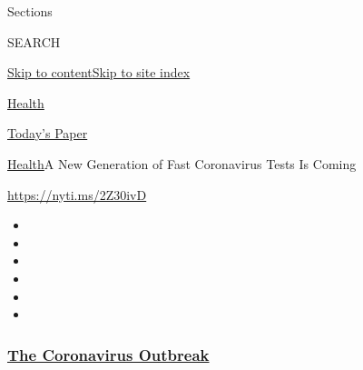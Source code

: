 Sections

SEARCH

\protect\hyperlink{site-content}{Skip to
content}\protect\hyperlink{site-index}{Skip to site index}

\href{https://www.nytimes3xbfgragh.onion/section/health}{Health}

\href{https://myaccount.nytimes3xbfgragh.onion/auth/login?response_type=cookie\&client_id=vi}{}

\href{https://www.nytimes3xbfgragh.onion/section/todayspaper}{Today's
Paper}

\href{/section/health}{Health}\textbar{}A New Generation of Fast
Coronavirus Tests Is Coming

\url{https://nyti.ms/2Z30ivD}

\begin{itemize}
\item
\item
\item
\item
\item
\item
\end{itemize}

\hypertarget{the-coronavirus-outbreak}{%
\subsubsection{\texorpdfstring{\href{https://www.nytimes3xbfgragh.onion/news-event/coronavirus?name=styln-coronavirus-national\&region=TOP_BANNER\&block=storyline_menu_recirc\&action=click\&pgtype=Article\&impression_id=cadc1e70-f4b6-11ea-90f6-17a6587a4d59\&variant=undefined}{The
Coronavirus
Outbreak}}{The Coronavirus Outbreak}}\label{the-coronavirus-outbreak}}

